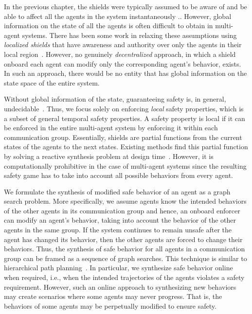 
In the previous chapter, the shields were typically assumed to be aware of and be able to affect all the agents in the system instantaneously \cite{multiagentshield}.. However,
global information on the state of all the agents is often difficult to obtain in multi-agent systems. There has been some work in relaxing these assumptions using \emph{localized shields} that have awareness and authority over only the agents in their local region~\cite{bhnfm}. However, no genuinely \emph{decentralized} approach, in which a shield onboard each agent can modify only the corresponding agent's behavior, exists. In such an approach, there would be no entity that has global information on the state space of the entire system. 

Without global information of the state, guaranteeing safety is, in general, undecidable~\cite{Schewe08}. Thus, we focus solely on enforcing \emph{local} safety properties, which is a subset of general temporal safety properties. A safety property is local if it can be enforced in the entire multi-agent system by enforcing it within each communication group. 
Essentially, shields are partial functions from the current states of the agents to the next states. 
Existing methods find this partial function by solving a reactive synthesis problem at design time~\cite{BloemKKW15,multiagentshield}. However, it is computationally prohibitive in the case of multi-agent systems since the resulting safety game has to take into account all possible behaviors from every agent. 

We formulate the synthesis of modified safe behavior of an agent as a graph search problem. More specifically, we assume agents know the intended behaviors of the other agents in its communication group and hence, an onboard enforcer can modify an agent's behavior, taking into account the behavior of the other agents in the same group. If the system continues to remain unsafe after the agent has changed its behavior, then the other agents are forced to change their behaviors. Thus, the synthesis of safe behavior for all agents in a communication group can be framed as a sequence of graph searches. This technique is similar to hierarchical path planning~\cite{Silver2005Jun}. In particular, we synthesize safe behavior online when required, i.e., when the intended trajectories of the agents violates a safety requirement. However, such an online approach to synthesizing new behaviors may create scenarios where some agents may never progress. That is, the behaviors of some agents may be perpetually modified to ensure safety.

